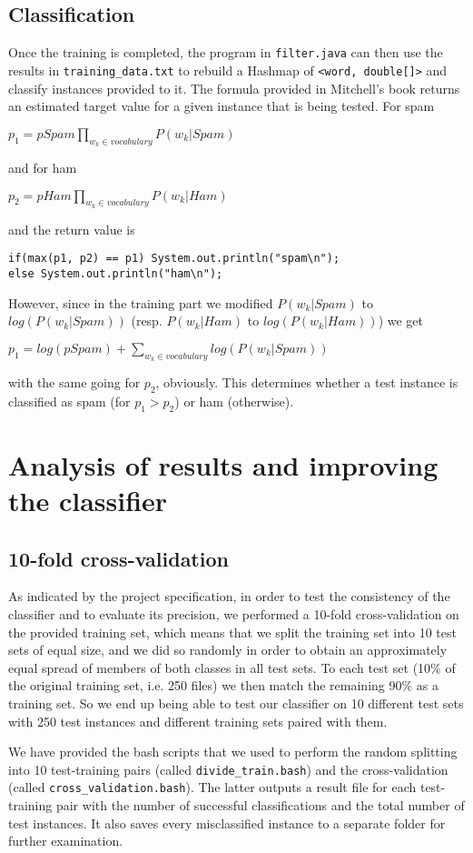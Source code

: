 \documentclass[12pt,a4paper]{report}
\begin{document}
\subsection{Classification}
Once the training is completed, the program in \texttt{filter.java} can then use the results in \texttt{training\_data.txt} to rebuild a Hashmap of \texttt{<word, double[]>} and classify instances provided to it. The formula provided in Mitchell's book returns an estimated target value for a given instance that is being tested. For spam
\begin{center}
$ p_1 = pSpam\prod\limits_{w_k \in vocabulary}P(w_k|Spam)$
\end{center} 
and for ham
\begin{center}
$ p_2 = pHam\prod\limits_{w_k \in vocabulary}P(w_k|Ham)$
\end{center} 
and the return value is 
\begin{lstlisting}
if(max(p1, p2) == p1) System.out.println("spam\n");
else System.out.println("ham\n");
\end{lstlisting}
However, since in the training part we modified $P(w_k|Spam)$ to $log(P(w_k|Spam))$ (resp. $P(w_k|Ham)$ to $log(P(w_k|Ham))$) we get 
\begin{center}
$ p_1 = log(pSpam) + \sum\limits_{w_k \in vocabulary}log(P(w_k|Spam))$
\end{center}
with the same going for $p_2$, obviously. This determines whether a test instance is classified as spam (for $p_1 > p_2$) or ham (otherwise).

\section{Analysis of results and improving the classifier}
\subsection{10-fold cross-validation}
As indicated by the project specification, in order to test the consistency of the classifier and to evaluate its precision, we performed a 10-fold cross-validation on the provided training set, which means that we split the training set into 10 test sets of equal size, and we did so randomly in order to obtain an approximately equal spread of members of both classes in all test sets. To each test set (10\% of the original training set, i.e. 250 files) we then match the remaining 90\% as a training set. So we end up being able to test our classifier on 10 different test sets with 250 test instances and different training sets paired with them.

We have provided the bash scripts that we used to perform the random splitting into 10 test-training pairs (called \texttt{divide\_train.bash}) and the cross-validation (called \texttt{cross\_validation.bash}). The latter outputs a result file for each test-training pair with the number of successful classifications and the total number of test instances. It also saves every misclassified instance to a separate folder for further examination.
\end{document}
